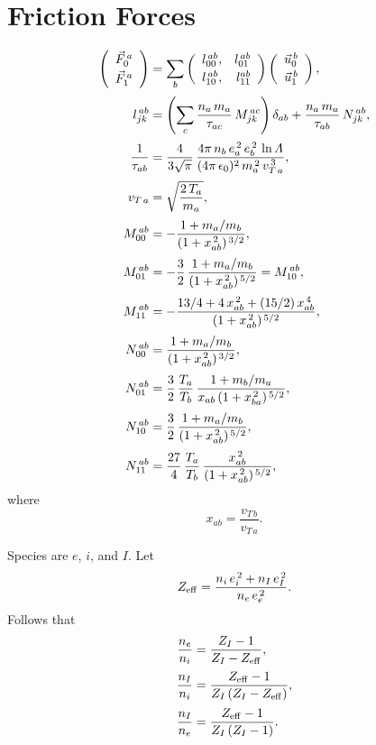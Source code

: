 \documentclass[12pt]{article}
\begin{document}
\section{Friction Forces}
\begin{align}
\left(\begin{array}{c}\vec{F}_{0}^{\,a}\\[0.5ex]\vec{F}_{1}^{\,a}\end{array}\right)&=\sum_b\left(
\begin{array}{rr} l_{00}^{\,ab},&l_{01}^{\,ab}\\[0.5ex]
l_{10}^{\,ab},&l_{11}^{ab}\end{array}\right)\left(\begin{array}{c}\vec{ u}_{0}^{\,b}\\[0.5ex]\vec{u}_{1}^{\,b}\end{array}\right),\\[0.5ex]
l_{jk}^{\,ab}&= \left(\sum_c \frac{n_a\,m_a}{\tau_{ac}}\,M^{\,ac}_{jk}\right)\delta_{ab} +\frac{n_a\,m_a}{\tau_{ab}}\,N^{\,ab}_{jk},\\[0.5ex]
\frac{1}{\tau_{ab}} &= \frac{4}{3\sqrt{\pi}}\,\frac{4\pi\,n_b\,e_a^{\,2}\,e_b^{\,2}\,\ln{\mit\Lambda}}{(4\pi\,\epsilon_0)^2 \,m_a^{\,2}\,v_{T\,a}^{\,3}},\\[0.5ex]
v_{T\,a} &= \sqrt{\frac{2\,T_a}{m_a}},\\[0.5ex]
M^{\,ab}_{00} &= -\frac{1+m_a/m_b}{(1+x_{ab}^{\,2})^{\,3/2}},\\[0.5ex]
M^{\,ab}_{01}&= -\frac{3}{2}\,\frac{1+m_a/m_b}{(1+x_{ab}^{\,2})^{\,5/2}}= M^{\,ab}_{10},\\[0.5ex]
M^{\,ab}_{11}& = -\frac{13/4 + 4\,x_{ab}^{\,2} + (15/2)\,x_{ab}^{\,4}}{(1+x_{ab}^{\,2})^{\,5/2}},\\[0.5ex]
N^{\,ab}_{00} &= \frac{1+m_a/m_b}{(1+x_{ab}^{\,2})^{\,3/2}},\\[0.5ex]
N^{\,ab}_{01}&= \frac{3}{2}\,\frac{T_a}{T_b}\,\frac{1+m_b/m_a}{x_{ab}\,(1+x_{ba}^{\,2})^{\,5/2}},\\[0.5ex]
N^{\,ab}_{10}&= \frac{3}{2}\,\frac{1+m_a/m_b}{(1+x_{ab}^{\,2})^{\,5/2}},\\[0.5ex]
N^{\,ab}_{11}& =\frac{27}{4}\,\frac{T_a}{T_b}\,\frac{x_{ab}^{\,2}}{(1+x_{ab}^{\,2})^{\,5/2}},
\end{align}
where 
\begin{equation}
x_{ab}=\frac{v_{T\,b}}{v_{T\,a}}.
\end{equation} 

Species are $e$, $i$, and $I$. Let 
\begin{equation}
Z_{\rm eff}= \frac{n_i\,e_i^{\,2}+n_I\,e_I^{\,2}}{n_e\,e_e^{\,2}}.
\end{equation} 
Follows that
\begin{align}
\frac{n_e}{n_i} &= \frac{Z_I-1}{Z_I-Z_{\rm eff}},\\[0.5ex]
\frac{n_I}{n_i} &=\frac{Z_{\rm eff}-1}{Z_I\,(Z_I-Z_{\rm eff})},\\[0.5ex]
\frac{n_I}{n_e} &= \frac{Z_{\rm eff}-1}{Z_I\,(Z_I-1)}.
\end{align}
\end{document}
